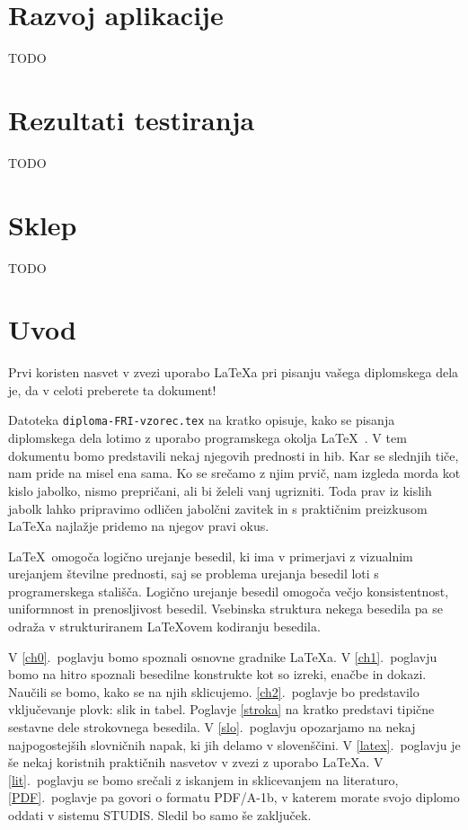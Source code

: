 \documentclass[a4paper,12pt,openright]{book}
\begin{document}
\chapter{Razvoj aplikacije}
TODO


\chapter{Rezultati testiranja}
TODO


\chapter{Sklep}
TODO


\chapter{Uvod}
Prvi koristen nasvet v zvezi uporabo \LaTeX{a} pri pisanju vašega diplomskega dela je, da v celoti preberete ta dokument!

Datoteka {\tt diploma-FRI-vzorec.tex} na kratko opisuje, kako se pisanja diplomskega dela lotimo z uporabo programskega okolja \LaTeX~\cite{lamport,nenajkrajsi}. 
V tem dokumentu bomo predstavili nekaj njegovih prednosti in hib. 
Kar se slednjih tiče, nam pride na misel ena sama. 
Ko se srečamo z njim prvič, nam izgleda morda kot kislo jabolko, nismo prepričani, ali bi želeli vanj ugrizniti. 
Toda prav iz kislih jabolk lahko pripravimo odličen jabolčni zavitek in s praktičnim preizkusom \LaTeX a najlažje pridemo na njegov pravi okus.

\LaTeX\ omogoča logično urejanje besedil, ki ima v primerjavi z vizualnim urejanjem številne prednosti, saj se problema urejanja besedil loti s programerskega stališča.
Logično urejanje besedil omogoča večjo konsistentnost, uniformnost in  prenosljivost besedil. 
Vsebinska struktura nekega besedila pa se odraža v strukturiranem \LaTeX ovem kodiranju besedila.

V \ref{ch0}.~poglavju bomo spoznali osnovne gradnike \LaTeX{a}.
V \ref{ch1}.~poglavju bomo na hitro spoznali besedilne konstrukte kot so izreki, enačbe in dokazi. 
Naučili se bomo, kako se na njih sklicujemo. 
\ref{ch2}.~poglavje bo predstavilo vključevanje plovk: slik in tabel. 
Poglavje \ref{stroka} na kratko predstavi tipične sestavne dele strokovnega besedila.
V \ref{slo}.~poglavju opozarjamo na nekaj najpogostejših slovničnih napak, ki jih delamo v slovenščini.
V \ref{latex}.~poglavju je še nekaj koristnih praktičnih nasvetov v zvezi z uporabo \LaTeX{a}.
V \ref{lit}.~poglavju se bomo srečali z iskanjem in sklicevanjem na literaturo,
\ref{PDF}.~poglavje pa govori o formatu PDF/A-1b, v katerem morate svojo diplomo oddati v sistemu STUDIS.
Sledil bo samo še zaključek.
\end{document}
